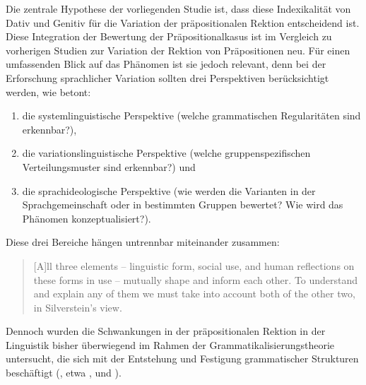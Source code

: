 Die zentrale Hypothese der vorliegenden Studie ist, dass diese Indexikalität von Dativ und Genitiv für die Variation %
der präpositionalen Rektion entscheidend ist. 
Diese Integration der Bewertung der Präpositionalkasus ist im Vergleich zu vorherigen Studien zur Variation der Rektion von Präpositionen neu.
Für einen umfassenden Blick auf das Phänomen ist sie jedoch relevant, denn bei der Erforschung sprachlicher Variation sollten drei Perspektiven berücksichtigt werden, wie \citet[223]{Silverstein.1985} betont: 
\begin{enumerate}
\item die systemlinguistische Perspektive (welche grammatischen Regularit{\"a}ten sind erkennbar?), 
\item die variationslinguistische Perspektive (welche gruppenspezifischen Verteilungsmuster sind erkennbar?) und 
\item die sprachideologische Perspektive (wie werden die Varianten in der Sprachgemeinschaft oder in bestimmten Gruppen bewertet? Wie wird das Ph{\"a}nomen konzeptualisiert?).
\end{enumerate} 
Diese drei Bereiche hängen untrennbar miteinander zusammen: 
\begin{quote}[A]ll three elements -- linguistic form, social use, and human reflections on these forms in use -- mutually shape and inform each other. To understand and explain any of them we must take into account both of the other two, in Silverstein's view.~\citep[436]{Woolard2008}\end{quote}
Dennoch wurden die Schwankungen in der präpositionalen Rektion in der Linguistik bisher überwiegend im Rahmen der Grammatikalisierungstheorie untersucht, die sich mit der Entstehung und Festigung grammatischer Strukturen beschäftigt (\citeauthor[s. vor allem die Arbeiten von][]{DiMeola2000}, etwa \citeyear{DiMeola2000}, \citeyear{DiMeola2003} und \citeyear{DiMeola2006}). 
